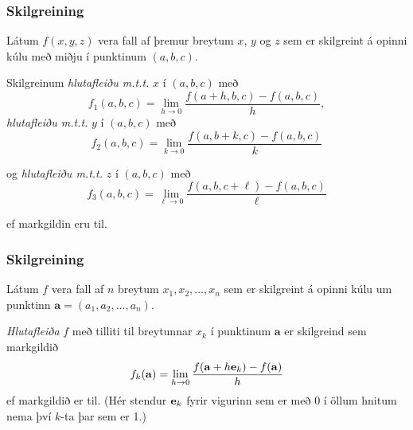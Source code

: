 \subsubsection{Skilgreining }
  
Látum $f(x,y,z)$ vera fall af þremur breytum $x$, $y$ og $z$ sem er skilgreint á opinni kúlu með miðju í punktinum $(a, b,c)$. 

\medskip

Skilgreinum \emph{hlutafleiðu m.t.t.} $x$ í $(a,b,c)$ með
$$f_1(a,b,c)=\lim_{h\rightarrow 0}\frac{f(a+h,b,c)-f(a,b,c)}{h},$$
 \emph{hlutafleiðu m.t.t.} $y$ í $(a,b,c)$ með
$$f_2(a,b,c)=\lim_{k\rightarrow 0}\frac{f(a,b+k,c)-f(a,b,c)}{k}$$

og \emph{hlutafleiðu m.t.t.} $z$ í $(a,b,c)$ með
$$f_3(a,b,c)=\lim_{\ell\rightarrow 0}\frac{f(a,b,c+\ell)-f(a,b,c)}{\ell}$$

ef markgildin eru til.
 


\subsubsection{Skilgreining }
Látum $f$ vera fall af
$n$ breytum $x_1,x_2,\ldots,x_n$ sem er skilgreint á opinni kúlu um punktinn $\mathbf{a}=(a_1, a_2, \ldots, a_n).$ 

\medskip	
{\em Hlutafleiða} $f$ með
tilliti til breytunnar $x_k$ í punktinum $\mathbf{a}$ er skilgreind sem markgildið 
$$f_k(\mathbf{a})=\lim_{h\rightarrow 0}\frac{f(\mathbf{a}+h\mbox{${\bf e}$}_k)-f(\mathbf{a})}{h}$$
ef markgildið er til.  (Hér stendur $\mbox{${\bf e}$}_k$ fyrir vigurinn sem er með
0 í öllum hnitum nema því $k$-ta þar sem er 1.)





